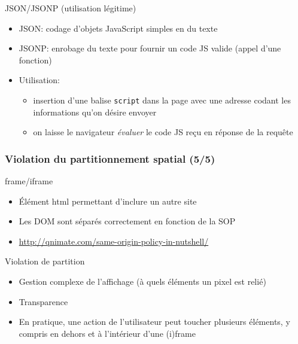\begin{reveals}
\begin{frame}
  \pause

  \begin{block}{JSON/JSONP (utilisation légitime)}
    \begin{itemize}
    \item JSON: codage d'objets JavaScript simples en du texte
    \item JSONP: enrobage du texte pour fournir un code JS valide
      (appel d'une fonction)
    \item Utilisation:
      \begin{itemize}
      \item insertion d'une balise \texttt{script} dans la page avec une
        adresse codant les informations qu'on d{\'e}sire envoyer
      \item on laisse le navigateur \emph{{\'e}valuer} le code JS re{\c c}u en
        r{\'e}ponse de la requ{\^e}te
      \end{itemize}
    \end{itemize}
  \end{block}
\end{frame}


\begin{frame}
  \frametitle{Violation du partitionnement spatial (5/5)}

  \begin{block}{frame/iframe}
    \begin{itemize}
    \item {\'E}l{\'e}ment html permettant d'inclure un autre site
    \item Les DOM sont s{\'e}par{\'e}s correctement en fonction de la SOP
    \item \url{http://qnimate.com/same-origin-policy-in-nutshell/}
    \end{itemize}
  \end{block}

  \pause
  
  \begin{block}{Violation de partition}
    \begin{itemize}
    \item Gestion complexe de l'affichage ({\`a} quels {\'e}l{\'e}ments un pixel
      est reli{\'e})
    \item Transparence
    \item En pratique, une action de l'utilisateur peut toucher
      plusieurs {\'e}l{\'e}ments, y compris en dehors et {\`a} l'int{\'e}rieur d'une
      (i)frame
    \end{itemize}
  \end{block}


\end{frame}
\end{reveals}
